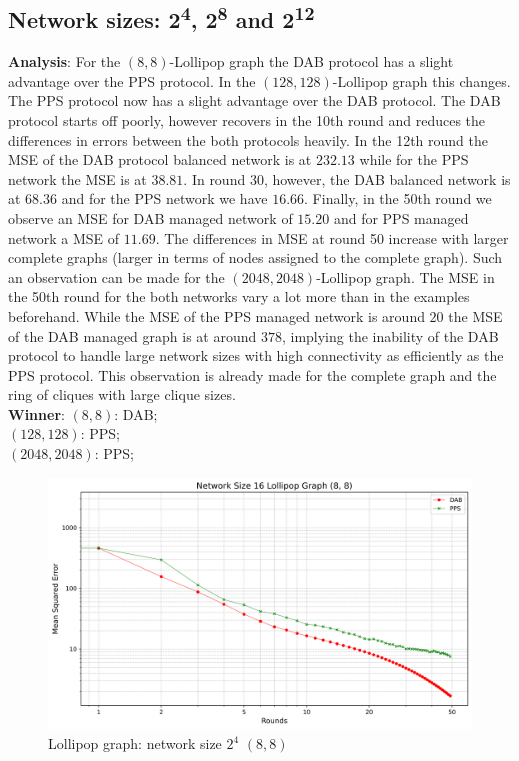 \subsection{Network sizes: 2\textsuperscript{4}, 2\textsuperscript{8} and 2\textsuperscript{12}}
\textbf{Analysis}: For the $(8, 8)$-Lollipop graph the DAB protocol has a slight advantage over the PPS protocol. In the $(128, 128)$-Lollipop graph this changes. The PPS protocol now has a slight advantage over the DAB protocol. The DAB protocol starts off poorly, however recovers in the 10th round and reduces the differences in errors between the both protocols heavily. In the 12th round the MSE of the DAB protocol balanced network is at $232.13$ while for the PPS network the MSE is at $38.81$. In round 30, however, the DAB balanced network is at $68.36$ and for the PPS network we have $16.66$. Finally, in the 50th round we observe an MSE for DAB managed network of $15.20$ and for PPS managed network a MSE of $11.69$. The differences in MSE at round 50 increase with larger complete graphs (larger in terms of nodes assigned to the complete graph). Such an observation can be made for the $(2048, 2048)$-Lollipop graph. The MSE in the 50th round for the both networks vary a lot more than in the examples beforehand. While the MSE of the PPS managed network is around $20$ the MSE of the DAB managed graph is at around $378$, implying the inability of the DAB protocol to handle large network sizes with high connectivity as efficiently as the PPS protocol. This observation is already made for the complete graph and the ring of cliques with large clique sizes. \\
\textbf{Winner}: $(8, 8)$: DAB; \\
$(128, 128)$: PPS; \\
$(2048, 2048)$: PPS;

\begin{figure}[H]
    \centering
    \includegraphics[scale=0.5]{figures/lollipopGraphSimulations/DAB_vs_PPS_LG_r50_n16.png}
    \caption{Lollipop graph: network size $2^{4}$ $(8, 8)$}
    \label{fig:8+8lollipop}
\end{figure}

